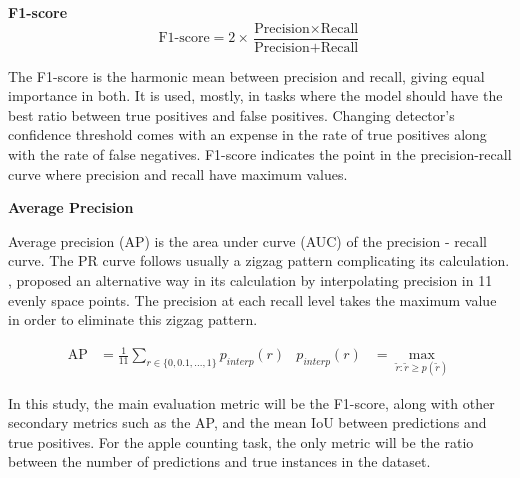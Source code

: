 \bigskip
\textbf{F1-score}
\bigskip\noindent
\begin{equation}
  \text{F1-score} = 2\times\frac{\text{Precision}\times \text{Recall}}{\text{Precision}+\text{Recall}}\end{equation} 
  
The F1-score is the harmonic mean between precision and recall, giving equal importance in both. It is used, mostly, in tasks where the model should have the best ratio between true positives and false positives. Changing detector's confidence threshold comes with an expense in the rate of true positives along with the rate of false negatives. F1-score indicates the point in the precision-recall curve where precision and recall have maximum values.

\bigskip
\textbf{Average Precision}
\bigskip\noindent

Average precision (AP) is the area under curve (AUC) of the precision - recall curve. The PR curve follows usually a zigzag pattern complicating its calculation. \cite{everingham2010pascal}, proposed an alternative way in its calculation by interpolating precision in 11 evenly space points. The precision at each recall level takes the maximum value in order to eliminate this zigzag pattern.

\begin{align}
  \text{AP} &= \frac{1}{11}\sum_{r\in\{0,0.1,...,1\}}p_{interp}(r)	&	p_{interp}(r) &= \max_{\tilde{r}:\tilde{r}\geq p(\tilde{r})}
\end{align} 

In this study, the main evaluation metric will be the F1-score, along with other secondary metrics such as the AP, and the mean IoU between predictions and true positives. For the apple counting task, the only metric will be the ratio between the number of predictions and true instances in the dataset.
